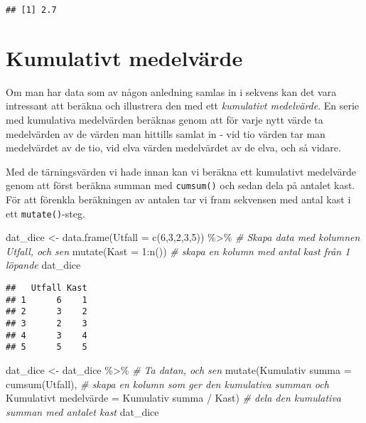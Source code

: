 \documentclass[
]{book}
\newenvironment{Shaded}{\begin{snugshade}}{\end{snugshade}}
\newcommand{\AttributeTok}[1]{\textcolor[rgb]{0.77,0.63,0.00}{#1}}
\newcommand{\CommentTok}[1]{\textcolor[rgb]{0.56,0.35,0.01}{\textit{#1}}}
\newcommand{\DecValTok}[1]{\textcolor[rgb]{0.00,0.00,0.81}{#1}}
\newcommand{\FunctionTok}[1]{\textcolor[rgb]{0.00,0.00,0.00}{#1}}
\newcommand{\NormalTok}[1]{#1}
\newcommand{\OtherTok}[1]{\textcolor[rgb]{0.56,0.35,0.01}{#1}}
\newcommand{\SpecialCharTok}[1]{\textcolor[rgb]{0.00,0.00,0.00}{#1}}
\newcommand{\StringTok}[1]{\textcolor[rgb]{0.31,0.60,0.02}{#1}}
\theoremstyle{definition}
\theoremstyle{definition}
\theoremstyle{definition}
\theoremstyle{definition}
\theoremstyle{remark}
\begin{document}
\begin{verbatim}
## [1] 2.7
\end{verbatim}

\hypertarget{kumulativt-medelvuxe4rde}{%
\section{Kumulativt medelvärde}\label{kumulativt-medelvuxe4rde}}

Om man har data som av någon anledning samlas in i sekvens kan det vara intressant att beräkna och illustrera den med ett \emph{kumulativt medelvärde}. En serie med kumulativa medelvärden beräknas genom att för varje nytt värde ta medelvärden av de värden man hittills samlat in - vid tio värden tar man medelvärdet av de tio, vid elva värden medelvärdet av de elva, och så vidare.

Med de tärningsvärden vi hade innan kan vi beräkna ett kumulativt medelvärde genom att först beräkna summan med \texttt{cumsum()} och sedan dela på antalet kast. För att förenkla beräkningen av antalen tar vi fram sekvensen med antal kast i ett \texttt{mutate()}-steg.

\begin{Shaded}
\begin{Highlighting}[]
\NormalTok{dat\_dice }\OtherTok{\textless{}{-}} \FunctionTok{data.frame}\NormalTok{(}\AttributeTok{Utfall =} \FunctionTok{c}\NormalTok{(}\DecValTok{6}\NormalTok{,}\DecValTok{3}\NormalTok{,}\DecValTok{2}\NormalTok{,}\DecValTok{3}\NormalTok{,}\DecValTok{5}\NormalTok{)) }\SpecialCharTok{\%\textgreater{}\%}               \CommentTok{\# Skapa data med kolumnen Utfall, och sen}
  \FunctionTok{mutate}\NormalTok{(}\AttributeTok{Kast =} \DecValTok{1}\SpecialCharTok{:}\FunctionTok{n}\NormalTok{())                                          }\CommentTok{\# skapa en kolumn med antal kast från 1 löpande}
\NormalTok{dat\_dice}
\end{Highlighting}
\end{Shaded}

\begin{verbatim}
##   Utfall Kast
## 1      6    1
## 2      3    2
## 3      2    3
## 4      3    4
## 5      5    5
\end{verbatim}

\begin{Shaded}
\begin{Highlighting}[]
\NormalTok{dat\_dice }\OtherTok{\textless{}{-}}\NormalTok{ dat\_dice }\SpecialCharTok{\%\textgreater{}\%}                                        \CommentTok{\# Ta datan, och sen}
  \FunctionTok{mutate}\NormalTok{(}\StringTok{\textasciigrave{}}\AttributeTok{Kumulativ summa}\StringTok{\textasciigrave{}} \OtherTok{=} \FunctionTok{cumsum}\NormalTok{(Utfall),                    }\CommentTok{\# skapa en kolumn som ger den kumulativa summan och}
         \StringTok{\textasciigrave{}}\AttributeTok{Kumulativt medelvärde}\StringTok{\textasciigrave{}} \OtherTok{=} \StringTok{\textasciigrave{}}\AttributeTok{Kumulativ summa}\StringTok{\textasciigrave{}} \SpecialCharTok{/}\NormalTok{ Kast)    }\CommentTok{\# dela den kumulativa summan med antalet kast}
\NormalTok{dat\_dice}
\end{Highlighting}
\end{Shaded}
\end{document}
